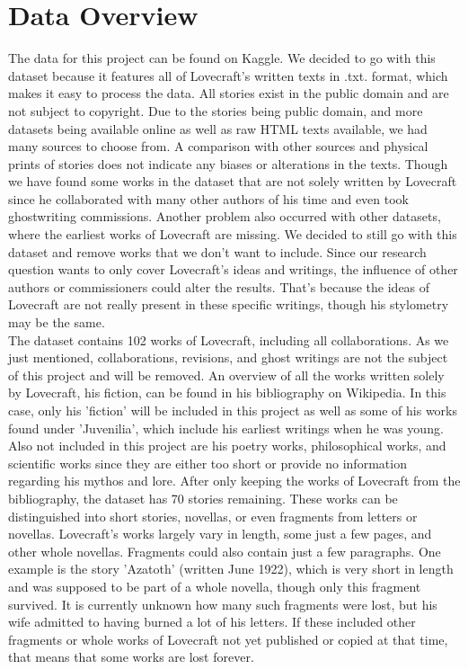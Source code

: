 \section{Data Overview}

The data for this project can be found on Kaggle. We decided to go with this dataset because it 
features all of Lovecraft's written texts in .txt. format, which makes it easy to process the data. 
All stories exist in the public domain and are not subject to copyright. Due to the stories being 
public domain, and more datasets being available online as well as raw HTML texts available, we 
had many sources to choose from. A comparison with other sources and physical prints of stories 
does not indicate any biases or alterations in the texts. Though we have found some works in the 
dataset that are not solely written by Lovecraft since he collaborated with many other authors of 
his time and even took ghostwriting commissions. Another problem also occurred with other datasets, 
where the earliest works of Lovecraft are missing. We decided to still go with this dataset and 
remove works that we don't want to include. Since our research question wants to only cover 
Lovecraft's ideas and writings, the influence of other authors or commissioners could alter the 
results. That's because the ideas of Lovecraft are not really present in these specific writings, 
though his stylometry may be the same.\\

The dataset contains 102 works of Lovecraft, including all collaborations. As we just mentioned, 
collaborations, revisions, and ghost writings are not the subject of this project and will be 
removed. An overview of all the works written solely by Lovecraft, his fiction, can be found in 
his bibliography on Wikipedia. In this case, only his 'fiction' will be included in this project 
as well as some of his works found under 'Juvenilia', which include his earliest writings when he 
was young. Also not included in this project are his poetry works, philosophical works, and 
scientific works since they are either too short or provide no information regarding his mythos 
and lore. After only keeping the works of Lovecraft from the bibliography, the dataset has 70 
stories remaining. These works can be distinguished into short stories, novellas, or even fragments 
from letters or novellas. Lovecraft's works largely vary in length, some just a few pages, and 
other whole novellas. Fragments could also contain just a few paragraphs. One example is the 
story 'Azatoth' (written June 1922), which is very short in length and was supposed to be part 
of a whole novella, though only this fragment survived. It is currently unknown how many such 
fragments were lost, but his wife admitted to having burned a lot of his letters. If these included 
other fragments or whole works of Lovecraft not yet published or copied at that time, that means 
that some works are lost forever.\\

